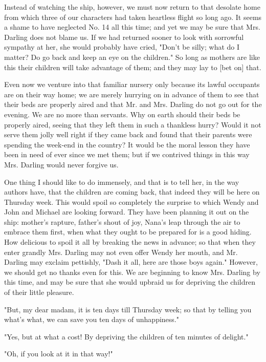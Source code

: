 Instead of watching the ship, however, we must now return to that desolate
home from which three of our characters had taken heartless flight so long
ago. It seems a shame to have neglected No. 14 all this time; and yet we
may be sure that Mrs. Darling does not blame us. If we had returned sooner
to look with sorrowful sympathy at her, she would probably have cried,
"Don't be silly; what do I matter? Do go back and keep an eye on the
children." So long as mothers are like this their children will take
advantage of them; and they may lay to [bet on] that.


Even now we venture into that familiar nursery only because its lawful
occupants are on their way home; we are merely hurrying on in advance of
them to see that their beds are properly aired and that Mr. and Mrs.
Darling do not go out for the evening. We are no more than servants. Why
on earth should their beds be properly aired, seeing that they left them
in such a thankless hurry? Would it not serve them jolly well right if
they came back and found that their parents were spending the week-end in
the country? It would be the moral lesson they have been in need of ever
since we met them; but if we contrived things in this way Mrs. Darling
would never forgive us.


One thing I should like to do immensely, and that is to tell her, in the
way authors have, that the children are coming back, that indeed they will
be here on Thursday week. This would spoil so completely the surprise to
which Wendy and John and Michael are looking forward. They have been
planning it out on the ship: mother's rapture, father's shout of joy,
Nana's leap through the air to embrace them first, when what they ought to
be prepared for is a good hiding. How delicious to spoil it all by
breaking the news in advance; so that when they enter grandly Mrs. Darling
may not even offer Wendy her mouth, and Mr. Darling may exclaim pettishly,
"Dash it all, here are those boys again." However, we should get no thanks
even for this. We are beginning to know Mrs. Darling by this time, and may
be sure that she would upbraid us for depriving the children of their
little pleasure.


"But, my dear madam, it is ten days till Thursday week; so that by telling
you what's what, we can save you ten days of unhappiness."


"Yes, but at what a cost! By depriving the children of ten minutes of
delight."


"Oh, if you look at it in that way!"


